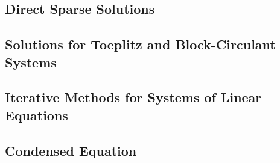 \subsection{Direct Sparse Solutions}


\subsection{Solutions for Toeplitz and Block-Circulant Systems}


\subsection{Iterative Methods for Systems of Linear Equations}


\subsection{Condensed Equation}

